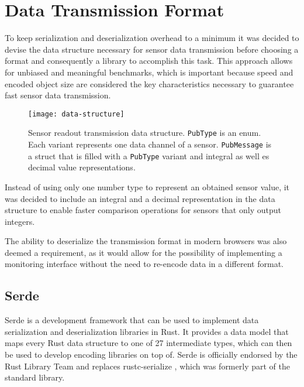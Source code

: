 \section{Data Transmission Format}
\author{Philip Trauner}

To keep serialization and deserialization overhead to a minimum it was decided to devise the data structure necessary for sensor data transmission before choosing a format and consequently a library to accomplish this task. This approach allows for unbiased and meaningful benchmarks, which is important because speed and encoded object size are considered the key characteristics necessary to guarantee fast sensor data transmission.

\begin{figure}[H]
\centering

\texttt{[image: data-structure]}
\caption{Sensor readout transmission data structure. \texttt{PubType} is an enum. Each variant represents one data channel of a sensor. \texttt{PubMessage} is a struct that is filled with a \texttt{PubType} variant and integral as well es decimal value representations.}
\end{figure}

Instead of using only one number type to represent an obtained sensor value, it was decided to include an integral and a decimal representation in the data structure to enable faster comparison operations for sensors that only output integers.

The ability to deserialize the transmission format in modern browsers was also deemed a requirement, as it would allow for the possibility of implementing a monitoring interface without the need to re-encode data in a different format. 

\subsection{Serde}
Serde is a development framework that can be used to implement data serialization and deserialization libraries in Rust. \cite{serde} 
It provides a data model that maps every Rust data structure to one of 27 intermediate types, which can then be used to develop encoding libraries on top of.
Serde is officially endorsed by the Rust Library Team and replaces rustc-serialize \cite{rustc-serialize-deprecation}, which was formerly part of the standard library. 

